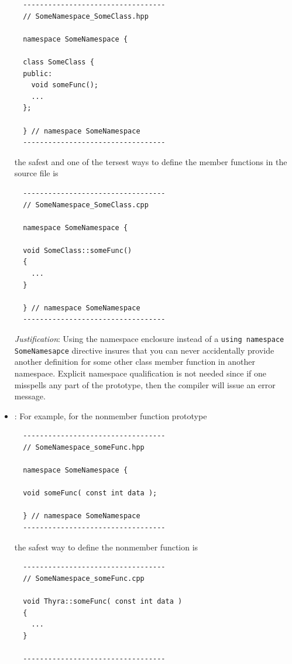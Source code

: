 \begin{itemize}
{\small\begin{verbatim}
  ----------------------------------
  // SomeNamespace_SomeClass.hpp

  namespace SomeNamespace {

  class SomeClass {
  public:
    void someFunc();
    ...
  };

  } // namespace SomeNamespace
  ----------------------------------
\end{verbatim}}

the safest and one of the tersest ways to define the member functions in the
source file is

{\small\begin{verbatim}
  ----------------------------------
  // SomeNamespace_SomeClass.cpp

  namespace SomeNamespace {

  void SomeClass::someFunc()
  {
    ...
  }

  } // namespace SomeNamespace
  ----------------------------------
\end{verbatim}}

{}\textit{Justification}: Using the namespace enclosure instead of a
{}\texttt{using namespace SomeNamesapce} directive insures that you can never
accidentally provide another definition for some other class member function
in another namespace.  Explicit namespace qualification is not needed since if
one misspells any part of the prototype, then the compiler will issue an error
message.

{}\item\GCGNamespaceFuncDefs: For example, for the nonmember function prototype

{\small\begin{verbatim}
  ----------------------------------
  // SomeNamespace_someFunc.hpp

  namespace SomeNamespace {

  void someFunc( const int data );

  } // namespace SomeNamespace
  ----------------------------------
\end{verbatim}}

the safest way to define the nonmember function is

{\small\begin{verbatim}
  ----------------------------------
  // SomeNamespace_someFunc.cpp

  void Thyra::someFunc( const int data )
  {
    ...
  }

  ----------------------------------
\end{verbatim}}


\end{itemize}
